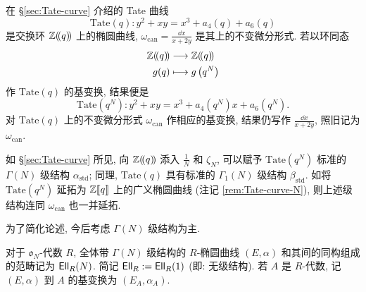 \begin{example}\label{eg:Tate-N}
	在 \S\ref{sec:Tate-curve} 介绍的 Tate 曲线
	\[ \mathrm{Tate}(q): y^2 + xy = x^3 + a_4(q) + a_6(q) \]
	是交换环 $\mathbb{Z}(\!(q)\!)$ 上的椭圆曲线, $\omega_{\mathrm{can}} = \frac{\dd x}{x + 2y}$ 是其上的不变微分形式. 若以环同态
	\begin{align*}
		\mathbb{Z}(\!(q)\!) & \longrightarrow \mathbb{Z}(\!(q)\!) \\
		g(q) & \longmapsto g\left(q^N\right)
	\end{align*}
	作 $\mathrm{Tate}(q)$ 的基变换, 结果便是
	\[ \mathrm{Tate}\left(q^N\right): y^2 + xy = x^3 + a_4(q^N)x + a_6(q^N). \]
	对 $\mathrm{Tate}(q)$ 上的不变微分形式 $\omega_{\mathrm{can}}$ 作相应的基变换, 结果仍写作 $\frac{\dd x}{x + 2y}$, 照旧记为 $\omega_{\mathrm{can}}$. 
	
	如 \S\ref{sec:Tate-curve} 所见, 向 $\mathbb{Z}(\!(q)\!)$ 添入 $\frac{1}{N}$ 和 $\zeta_N$, 可以赋予 $\mathrm{Tate}\left(q^N \right)$ 标准的 $\Gamma(N)$ 级结构 $\alpha_{\mathrm{std}}$; 同理, $\mathrm{Tate}(q)$ 具有标准的 $\Gamma_1(N)$ 级结构 $\beta_{\mathrm{std}}$. 如将 $\mathrm{Tate}\left(q^N\right)$ 延拓为 $\mathbb{Z}\llbracket q\rrbracket$ 上的广义椭圆曲线 (注记 \ref{rem:Tate-curve-N}), 则上述级结构连同 $\omega_{\mathrm{can}}$ 也一并延拓.
\end{example}

为了简化论述, 今后考虑 $\Gamma(N)$ 级结构为主.

对于 $\mathfrak{o}_N$-代数 $R$, 全体带 $\Gamma(N)$ 级结构的 $R$-椭圆曲线 $(E, \alpha)$ 和其间的同构组成的范畴记为 $\mathsf{Ell}_R(N)$. 简记 $\mathsf{Ell}_R := \mathsf{Ell}_R(1)$ (即: 无级结构). 若 $A$ 是 $R$-代数, 记 $(E, \alpha)$ 到 $A$ 的基变换为 $(E_A, \alpha_A)$.

